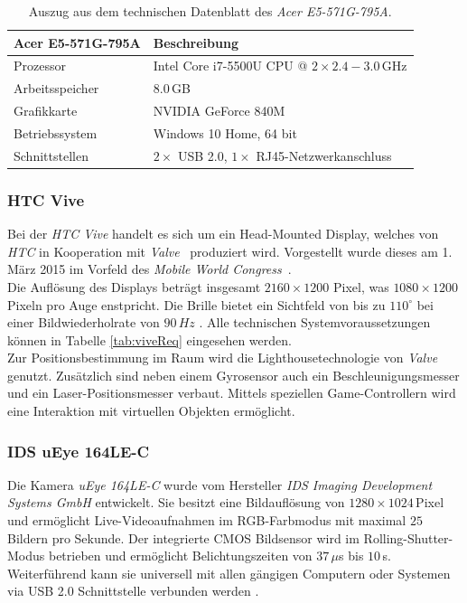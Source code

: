 \begin{table}
	\centering
	\begin{tabular}{|l|l|}
		\hline
		\Absatzbox{}
		\textbf{Acer E5-571G-795A}& \textbf{Beschreibung} \\
		\hline
		Prozessor & Intel Core i7-5500U CPU @ $2\times 2.4-3.0$\,GHz\\
		\hline
		Arbeitsspeicher & $8.0$\,GB \\
		\hline 
		Grafikkarte & NVIDIA GeForce 840M\\
		\hline
		Betriebssystem & Windows 10 Home, 64 bit \\
		\hline
		Schnittstellen & $2\times$ USB 2.0, $1\times$ RJ45-Netzwerkanschluss\\
		\hline
	\end{tabular}
	\caption{Auszug aus dem technischen Datenblatt des \textit{Acer E5-571G-795A}.}
	\label{tab:TrackingCompParam}
\end{table}


\subsubsection{HTC Vive}\label{sec:Vive} 
Bei der \textit{HTC Vive} handelt es sich um ein Head-Mounted Display, welches von \textit{HTC} in Kooperation mit \textit{Valve}~\cite{website:Valve} produziert wird. Vorgestellt wurde dieses am 1. März 2015 im Vorfeld des \textit{Mobile World Congress}~\cite{website:mobileworldcongress}.\\
Die Auflösung des Displays beträgt insgesamt $2160\times1200$ Pixel, was $1080\times1200$ Pixeln pro Auge enstpricht. Die Brille bietet ein Sichtfeld von bis zu $110^\circ$ bei einer Bildwiederholrate von $90\,Hz$ \cite{website:HTC_Vive}. Alle technischen Systemvoraussetzungen können in Tabelle \ref{tab:viveReq} eingesehen werden. \\
Zur Positionsbestimmung im Raum wird die Lighthousetechnologie von \textit{Valve} genutzt. Zusätzlich sind neben einem Gyrosensor auch ein Beschleunigungsmesser und ein Laser-Positionsmesser verbaut. Mittels speziellen Game-Controllern wird eine Interaktion mit virtuellen Objekten ermöglicht.

\subsubsection{IDS uEye 164LE-C}\label{sec:uEye} 
Die Kamera \textit{uEye 164LE-C} wurde vom Hersteller \textit{IDS Imaging Development Systems GmbH} entwickelt. Sie besitzt eine Bildauflösung von $1280\times1024$\,Pixel und ermöglicht Live-Videoaufnahmen im RGB-Farbmodus mit maximal $25$ Bildern pro Sekunde. Der integrierte CMOS Bildsensor wird im Rolling-Shutter-Modus betrieben und ermöglicht Belichtungszeiten von $37\,\mu$s bis $10$\,s. Weiterführend kann sie universell mit allen gängigen Computern oder Systemen via USB 2.0 Schnittstelle verbunden werden \cite{website:UEyeTechSpec}.

